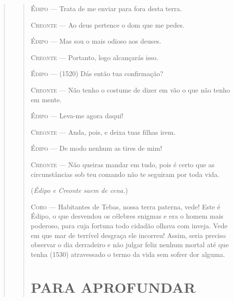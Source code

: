 \begin{verse}
\begin{verse}
\textsc{Édipo} --- Trata de me enviar para fora desta terra.

\textsc{Creonte} --- Ao deus pertence o dom que me pedes.

\textsc{Édipo} --- Mas sou o mais odioso aos deuses.

\textsc{Creonte} --- Portanto, logo alcançarás isso.

\textsc{Édipo} --- (1520) Dás então tua confirmação?

\textsc{Creonte} --- Não tenho o costume de dizer em vão o que não tenho em mente.

\textsc{Édipo} --- Leva-me agora daqui!

\textsc{Creonte} --- Anda, pois, e deixa tuas filhas irem.

\textsc{Édipo} --- De modo nenhum as tires de mim!

\textsc{Creonte} --- Não queiras mandar em tudo, pois é certo que as circunstâncias sob teu
comando não te seguiram por toda vida.

(\emph{Édipo e Creonte saem de cena.})

\textsc{Coro} --- Habitantes de Tebas, nossa terra paterna, vede! Este é Édipo, o que
desvendou os célebres enigmas e era o homem mais poderoso, para cuja
fortuna todo cidadão olhava com inveja. Vede em que mar de terrível
desgraça ele incorreu! Assim, seria preciso observar o dia derradeiro e
não julgar feliz nenhum mortal até que tenha (1530) atravessado o termo
da vida sem sofrer dor alguma.

\chapter{PARA APROFUNDAR}


\end{verse}
\end{verse}
